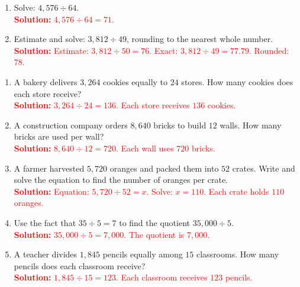 \documentclass[12pt]{article}
\begin{document}
\begin{tcolorbox}[colframe=black!60, colback=white, 
coltitle=black, colbacktitle=black!15, fonttitle=\bfseries\Large, 
title=Exercises, halign title=center, left=10pt, right=10pt, top=10pt, bottom=60pt]
\begin{enumerate}[itemsep=3em]
    \item Solve: \( 4,576 \div 64 \).\\
    \textcolor{red}{\textbf{Solution:} \(4,576 \div 64 = 71\).}

    \item Estimate and solve: \( 3,812 \div 49 \), rounding to the nearest whole number.\\
    \textcolor{red}{\textbf{Solution:} Estimate: \(3,812 \div 50 = 76\). Exact: \(3,812 \div 49 = 77.79\). Rounded: \(78\).}
\end{enumerate}
\end{tcolorbox}

\vspace{1em}

\begin{tcolorbox}[colframe=black!60, colback=white, 
coltitle=black, colbacktitle=black!15, fonttitle=\bfseries\Large, 
title=Problems, halign title=center, left=10pt, right=10pt, top=10pt, bottom=100pt]
\begin{enumerate}[start=9, itemsep=3em]
    \item A bakery delivers \( 3,264 \) cookies equally to \( 24 \) stores. How many cookies does each store receive?\\
    \textcolor{red}{\textbf{Solution:} \(3,264 \div 24 = 136\). Each store receives \(136\) cookies.}

    \item A construction company orders \( 8,640 \) bricks to build \( 12 \) walls. How many bricks are used per wall?\\
    \textcolor{red}{\textbf{Solution:} \(8,640 \div 12 = 720\). Each wall uses \(720\) bricks.}

    \item A farmer harvested \( 5,720 \) oranges and packed them into \( 52 \) crates. Write and solve the equation to find the number of oranges per crate.\\
    \textcolor{red}{\textbf{Solution:} Equation: \(5,720 \div 52 = x\). Solve: \(x = 110\). Each crate holds \(110\) oranges.}

    \item Use the fact that \( 35 \div 5 = 7 \) to find the quotient \( 35,000 \div 5 \).\\
    \textcolor{red}{\textbf{Solution:} \(35,000 \div 5 = 7,000\). The quotient is \(7,000\).}

    \item A teacher divides \( 1,845 \) pencils equally among \( 15 \) classrooms. How many pencils does each classroom receive?\\
    \textcolor{red}{\textbf{Solution:} \(1,845 \div 15 = 123\). Each classroom receives \(123\) pencils.}


\end{enumerate}
\end{tcolorbox}
\end{document}
